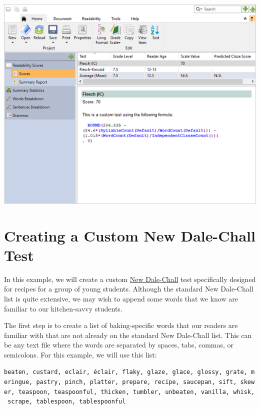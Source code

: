 \documentclass[
]{book}
\theoremstyle{definition}
\theoremstyle{definition}
\theoremstyle{definition}
\theoremstyle{definition}
\theoremstyle{remark}
\begin{document}
\includegraphics{Images/CustomTestExample1Score.png}


\hypertarget{creating-a-custom-new-dale-chall-test}{%
\section{\texorpdfstring{Creating a Custom New Dale-Chall Test}{Creating a Custom New Dale-Chall Test}}\label{creating-a-custom-new-dale-chall-test}}

In this example, we will create a custom \protect\hyperlink{dale-chall-test}{New Dale-Chall} test specifically designed for recipes for a group of young students. Although the standard New Dale-Chall list is quite extensive, we may wish to append some words that we know are familiar to our kitchen-savvy students.

The first step is to create a list of baking-specific words that our readers are familiar with that are not already on the standard New Dale-Chall list. This can be any text file where the words are separated by spaces, tabs, commas, or semicolons. For this example, we will use this list:

\texttt{beaten,\ custard,\ eclair,\ éclair,\ flaky,\ glaze,\ glace,\ glossy,\ grate,\ meringue,\ pastry,\ pinch,\ platter,\ prepare,\ recipe,\ saucepan,\ sift,\ skewer,\ teaspoon,\ teaspoonful,\ thicken,\ tumbler,\ unbeaten,\ vanilla,\ whisk,\ scrape,\ tablespoon,\ tablespoonful}
\end{document}
